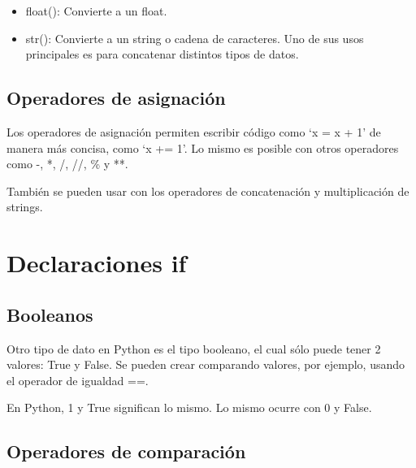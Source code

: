 \documentclass{report}
\newcommand{\simple}[1]{`#1'}
\begin{document}
{\begin{itemize}
  \item float(): Convierte a un float.
  

  \item str(): Convierte a un string o cadena de caracteres. Uno de sus usos principales es para concatenar distintos tipos de datos.


\end{itemize}

\section{Operadores de asignación}

Los operadores de asignación permiten escribir código como \simple{x = x + 1} de manera más concisa, como \simple{x += 1}. Lo mismo es posible con otros operadores como -, *, /, //, \% y **.


También se pueden usar con los operadores de concatenación y multiplicación de strings.


\clearpage\chapter{Declaraciones if}

\section{Booleanos}

Otro tipo de dato en Python es el tipo booleano, el cual sólo puede tener 2 valores: True y False. Se pueden crear comparando valores, por ejemplo, usando el operador de igualdad ==.



En Python, 1 y True significan lo mismo. Lo mismo ocurre con 0 y False.


\section{Operadores de comparación}

}
\end{document}
